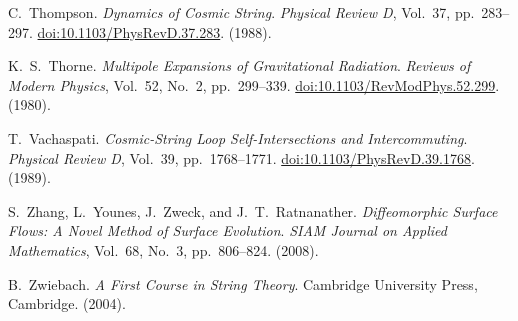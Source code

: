 \documentclass{article}
\numberwithin{tm}{section}
\numberwithin{dn}{section}
\numberwithin{as}{section}
\numberwithin{rk}{section}
\numberwithin{lem}{section}
\numberwithin{ax}{section}
\numberwithin{pp}{section}
\numberwithin{eg}{section}
\numberwithin{war}{section}
\numberwithin{equation}{section}
\numberwithin{prop}{section}
\numberwithin{nt}{section}
\numberwithin{rc}{section}
\begin{document}
\begin{thebibliography}{9}
C.~Thompson. \emph{Dynamics of Cosmic String}.
\emph{Physical Review D}, Vol.~37, pp.~283--297.
\href{https://doi.org/10.1103/PhysRevD.37.283}
{doi:10.1103/PhysRevD.37.283}. (1988).

K.~S.~Thorne. \emph{Multipole Expansions of Gravitational Radiation}. \emph{Reviews of Modern Physics}, Vol.~52, No.~2, pp.~299--339. \href{https://doi.org/10.1103/RevModPhys.52.299}{doi:10.1103/RevModPhys.52.299}. (1980).

T.~Vachaspati. \emph{Cosmic-String Loop Self-Intersections and Intercommuting}.
\emph{Physical Review D}, Vol.~39, pp.~1768--1771.
\href{https://doi.org/10.1103/PhysRevD.39.1768}
{doi:10.1103/PhysRevD.39.1768}. (1989).

S.~Zhang, L.~Younes, J.~Zweck, and J.~T.~Ratnanather. \emph{Diffeomorphic Surface Flows: A Novel Method of Surface Evolution}. \emph{SIAM Journal on Applied Mathematics}, Vol.~68, No.~3, pp.~806--824. (2008).

B.~Zwiebach. \emph{A First Course in String Theory}. Cambridge University Press, Cambridge. (2004).

\end{thebibliography}
\end{document}
